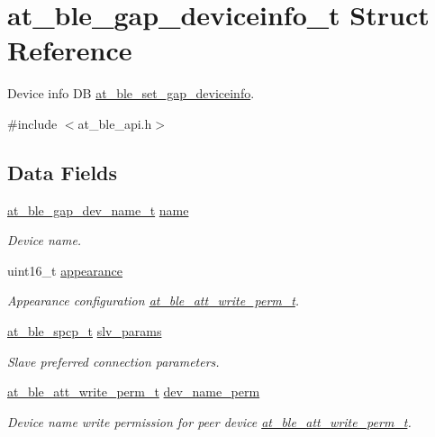 \hypertarget{structat__ble__gap__deviceinfo__t}{}\section{at\+\_\+ble\+\_\+gap\+\_\+deviceinfo\+\_\+t Struct Reference}
\label{structat__ble__gap__deviceinfo__t}


Device info DB \mbox{\hyperlink{group__gap__dev__config__group_gaed47ccba87a2a4989e49243c5de5a767}{at\+\_\+ble\+\_\+set\+\_\+gap\+\_\+deviceinfo}}.  




{\ttfamily \#include $<$at\+\_\+ble\+\_\+api.\+h$>$}

\subsection*{Data Fields}
\begin{DoxyCompactItemize}
\item 
\mbox{\hyperlink{structat__ble__gap__dev__name__t}{at\+\_\+ble\+\_\+gap\+\_\+dev\+\_\+name\+\_\+t}} \mbox{\hyperlink{structat__ble__gap__deviceinfo__t_a3f127c06ed9fc788bfcea253ab0b9d43}{name}}
\begin{DoxyCompactList}\small\item\em Device name. \end{DoxyCompactList}\item 
uint16\+\_\+t \mbox{\hyperlink{structat__ble__gap__deviceinfo__t_aae507e6864c05476c851ba7548517a3c}{appearance}}
\begin{DoxyCompactList}\small\item\em Appearance configuration \mbox{\hyperlink{at__ble__api_8h_acd9a0371335811dbc90e98a7802a8968}{at\+\_\+ble\+\_\+att\+\_\+write\+\_\+perm\+\_\+t}}. \end{DoxyCompactList}\item 
\mbox{\hyperlink{structat__ble__spcp__t}{at\+\_\+ble\+\_\+spcp\+\_\+t}} \mbox{\hyperlink{structat__ble__gap__deviceinfo__t_a4bc48c20ac9f987e7c458fa3bca69e7b}{slv\+\_\+params}}
\begin{DoxyCompactList}\small\item\em Slave preferred connection parameters. \end{DoxyCompactList}\item 
\mbox{\hyperlink{at__ble__api_8h_acd9a0371335811dbc90e98a7802a8968}{at\+\_\+ble\+\_\+att\+\_\+write\+\_\+perm\+\_\+t}} \mbox{\hyperlink{structat__ble__gap__deviceinfo__t_a68f6957b4c43ca820e048dd644735288}{dev\+\_\+name\+\_\+perm}}
\begin{DoxyCompactList}\small\item\em Device name write permission for peer device \mbox{\hyperlink{at__ble__api_8h_acd9a0371335811dbc90e98a7802a8968}{at\+\_\+ble\+\_\+att\+\_\+write\+\_\+perm\+\_\+t}}. \end{DoxyCompactList}\end{DoxyCompactItemize}


